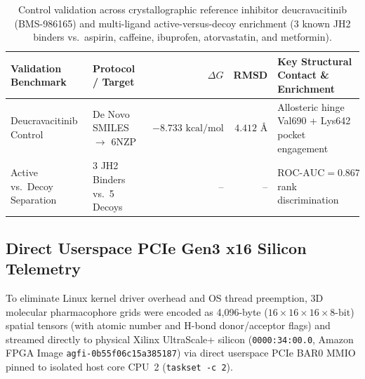 \documentclass[10pt,letterpaper]{article}
\begin{document}
\begin{table}[h!]
\centering
\footnotesize
\begin{tabularx}{\textwidth}{@{}llrrX@{}}
\toprule
\textbf{Validation Benchmark} & \textbf{Protocol / Target} & \textbf{$\Delta G$} & \textbf{RMSD} & \textbf{Key Structural Contact \& Enrichment} \\
\midrule
Deucravacitinib Control & De Novo SMILES $\rightarrow$ 6NZP & $-8.733\text{ kcal/mol}$ & $4.412\text{ Å}$ & Allosteric hinge Val690 + Lys642 pocket engagement \\
Active vs.\ Decoy Separation & 3 JH2 Binders vs.\ 5 Decoys & -- & -- & $\text{ROC-AUC} = 0.867$ rank discrimination \\
\bottomrule
\end{tabularx}
\caption{Control validation across crystallographic reference inhibitor deucravacitinib (BMS-986165) and multi-ligand active-versus-decoy enrichment (3 known JH2 binders vs.\ aspirin, caffeine, ibuprofen, atorvastatin, and metformin).}
\end{table}

\subsection{Direct Userspace PCIe Gen3 x16 Silicon Telemetry}
To eliminate Linux kernel driver overhead and OS thread preemption, 3D molecular pharmacophore grids were encoded as 4,096-byte ($16\times16\times16\times 8\text{-bit}$) spatial tensors (with atomic number and H-bond donor/acceptor flags) and streamed directly to physical Xilinx UltraScale+ silicon (\texttt{0000:34:00.0}, Amazon FPGA Image \texttt{agfi-0b55f06c15a385187}) via direct userspace PCIe BAR0 MMIO pinned to isolated host core CPU~2 (\texttt{taskset -c 2}).
\end{document}
